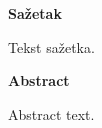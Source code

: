 \newpage
\thispagestyle{empty}
\begin{center}
 \vspace*{2cm}
  
  
\end{center}


\newpage
\thispagestyle{empty}
\begin{center}


  \vspace*{1cm}
  \textbf{\large Sažetak}
\end{center}

Tekst sažetka.

\newpage
\thispagestyle{empty}
\begin{center}
	
	
	\vspace*{1cm}
	\textbf{\large Abstract}
\end{center}

Abstract text.


\newpage

\thispagestyle{empty}

